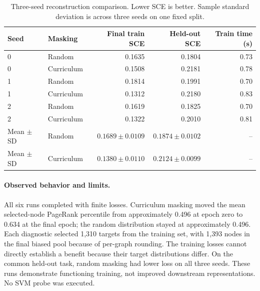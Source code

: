 \documentclass{article}
\begin{document}
\clearpage
\begin{table}[t]
\centering\small
\begin{tabular}{llrrr}
\toprule
Seed & Masking & Final train SCE & Held-out SCE & Train time (s)\\\midrule
0 & Random & 0.1635 & 0.1804 & 0.73\\
0 & Curriculum & 0.1508 & 0.2181 & 0.78\\
1 & Random & 0.1814 & 0.1991 & 0.70\\
1 & Curriculum & 0.1312 & 0.2180 & 0.83\\
2 & Random & 0.1619 & 0.1825 & 0.70\\
2 & Curriculum & 0.1322 & 0.2010 & 0.81\\
\midrule
Mean $\pm$ SD & Random & $0.1689\pm0.0109$ & $0.1874\pm0.0102$ & --\\
Mean $\pm$ SD & Curriculum & $0.1380\pm0.0110$ & $0.2124\pm0.0099$ & --\\
\bottomrule
\end{tabular}
\caption{Three-seed reconstruction comparison. Lower SCE is better. Sample standard deviation is across three seeds on one fixed split.}\label{tab:results}
\end{table}

\paragraph{Observed behavior and limits.}
All six runs completed with finite losses. Curriculum masking moved the mean selected-node PageRank percentile from approximately 0.496 at epoch zero to 0.634 at the final epoch; the random distribution stayed at approximately 0.496. Each diagnostic selected 1,310 targets from the training set, with 1,393 nodes in the final biased pool because of per-graph rounding. The training losses cannot directly establish a benefit because their target distributions differ. On the common held-out task, random masking had lower loss on all three seeds. These runs demonstrate functioning training, not improved downstream representations. No SVM probe was executed.
\end{document}

